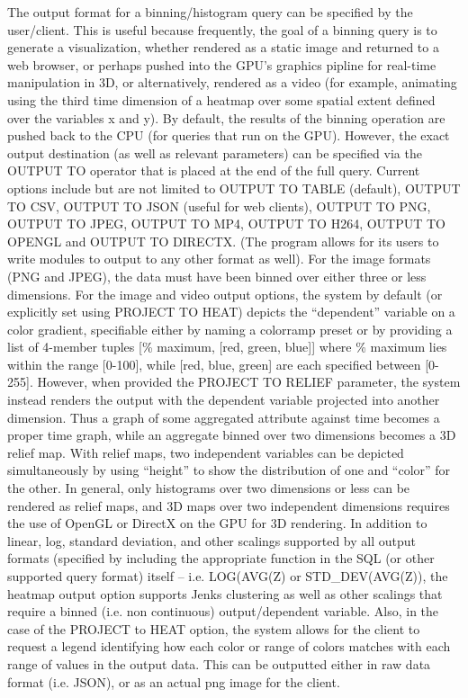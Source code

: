 \documentclass[twocolumn]{article}
\begin{document}
The output format for a binning/histogram query can be specified by the user/client. This is useful because frequently, the goal of a binning query is to generate a visualization, whether rendered as a static image and returned to a web browser, or perhaps pushed into the GPU’s graphics pipline for real-time manipulation in 3D, or alternatively, rendered as a video (for example, animating using the third time dimension of a heatmap over some spatial extent defined over the variables x and y). By default, the results of the binning operation are pushed back to the CPU (for queries that run on the GPU). However, the exact output destination (as well as relevant parameters) can be specified via the OUTPUT TO operator that is placed at the end of the full query. Current options include but are not limited to OUTPUT TO TABLE (default), OUTPUT TO CSV, OUTPUT TO JSON (useful for web clients), OUTPUT TO PNG, OUTPUT TO JPEG, OUTPUT TO MP4, OUTPUT TO H264, OUTPUT TO OPENGL and OUTPUT TO DIRECTX. (The program allows for its users to write modules to output to any other format as well). For the image formats (PNG and JPEG), the data must have been binned over either three or less dimensions. For the image and video output options, the system by default (or explicitly set using PROJECT TO HEAT) depicts the “dependent” variable on a color gradient, specifiable either by naming a colorramp preset or by providing a list of 4-member tuples [\% maximum, [red, green, blue]] where \% maximum lies within the range [0-100], while [red, blue, green] are each specified between [0-255]. However, when provided the PROJECT TO RELIEF parameter, the system instead renders the output with the dependent variable projected into another dimension. Thus a graph of some aggregated attribute against time becomes a proper time graph, while an aggregate binned over two dimensions becomes a 3D relief map. With relief maps, two independent variables can be depicted simultaneously by using “height” to show the distribution of one and “color” for the other. In general, only histograms over two dimensions or less can be rendered as relief maps, and 3D maps over two independent dimensions requires the use of OpenGL or DirectX on the GPU for 3D rendering.
In addition to linear, log, standard deviation, and other scalings supported by all output formats (specified by including the appropriate function in the SQL (or other supported query format) itself – i.e. LOG(AVG(Z) or STD_DEV(AVG(Z)), the heatmap output option supports Jenks clustering as well as other scalings that require a binned (i.e. non continuous) output/dependent variable. Also, in the case of the PROJECT to HEAT option, the system allows for the client to request a legend identifying how each color or range of colors matches with each range of values in the output data. This can be outputted either in raw data format (i.e. JSON), or as an actual png image for the client.
\end{document}
